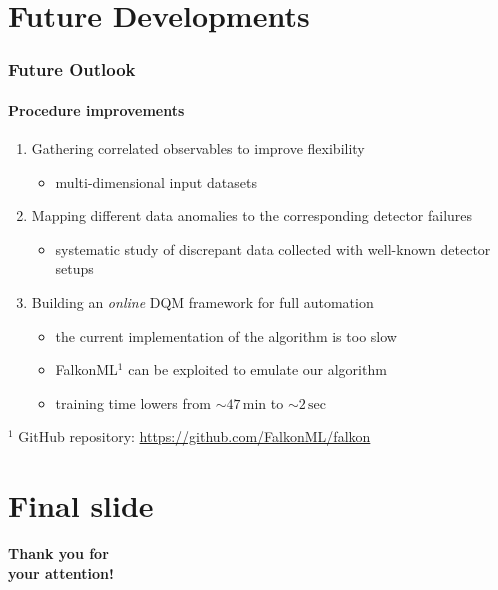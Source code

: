 \documentclass{beamer}
\begin{document}
	\section{Future Developments}
	\begin{frame}
		\frametitle{Future Outlook}
		\framesubtitle{Procedure improvements}

		\begin{enumerate}
			\item Gathering correlated observables to improve flexibility
				\begin{itemize}
					\item multi-dimensional input datasets
				\end{itemize}
				\vfill
			\item Mapping different data anomalies to the corresponding detector failures
				\begin{itemize}
					\item systematic study of discrepant data collected with well-known detector setups
				\end{itemize}
				\vfill
			\item Building an \alert{\textit{online}} DQM framework for full automation
				\begin{itemize}
					\item the current implementation of the algorithm is too slow 
					\item FalkonML$^{1}$ can be exploited to emulate our algorithm 
					\item training time lowers from $\sim 47\,\text{min}$ to $\sim$\alert{$2\,\text{sec}$}
				\end{itemize}
		\end{enumerate}



		\scriptsize
		$^{1}$ GitHub repository: \url{https://github.com/FalkonML/falkon}

		
	\end{frame}






	\appendix

	\section{Final slide}
	\begin{frame}
		\centering
		\Huge
		\bfseries
		{\color{white}
		Thank you for \\ your attention!}
	\end{frame}
\end{document}
